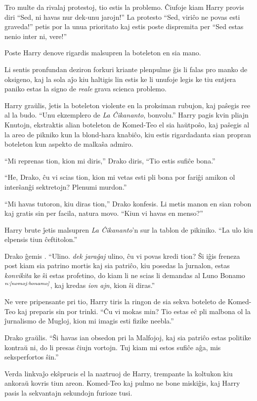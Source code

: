 Tro multe da rivalaj protestoj, tio estis la problemo. Ĉiufoje kiam
Harry provis diri ``Sed, ni havas nur dek-unu jarojn!'' La protesto
``Sed, viriĉo ne povas esti graveda!'' petis por la unua prioritato
kaj estis poste dispremita per ``Sed estas nenio inter ni, vere!''


Poste Harry denove rigardis malsupren la boteleton en sia mano.

Li sentis pronfundan deziron forkuri kriante plenpulme ĝis li falas
pro manko de oksigeno, kaj la sola aĵo kiu haltigis lin estis ke li
unufoje legis ke tiu entjera paniko estas la signo de \emph{reale} grava
scienca problemo.

Harry graŭlis, ĵetis la boteleton violente en la proksiman rubujon, kaj
paŝegis ree al la budo. ``Unu ekzemplero de \emph{La Ĉikananto},
bonvolu.'' Harry pagis kvin pliajn Knutojn, ekstraktis alian boteleton de
Komed-Teo el sia haŭtpoŝo, kaj paŝegis al la areo de pikniko kun
la blond-hara knabiĉo, kiu estis rigardadanta sian propran boteleton kun
aspekto de malkaŝa admiro.

``Mi reprenas tion, kion mi diris,'' Drako diris, ``Tio estis sufiĉe bona.''

``He, Drako, ĉu vi scias tion, kion mi vetas esti pli bona por fariĝi
amikon ol interŝanĝi sektretojn? Plenumi murdon.''

``Mi havas tutoron, kiu diras tion,'' Drako konfesis. Li metis manon
en sian robon kaj gratis sin per facila, natura movo. ``Kiun vi havas
en menso?''

Harry brute ĵetis malsupren \emph{La Ĉikananto}'n sur la tablon de
pikiniko. ``La ulo kiu elpensis tiun ĉeftitolon.''

Drako ĝemis . ``Ulino. \emph{dek jaraĝaj} ulino, ĉu vi povas kredi
tion? Ŝi iĝis freneza post kiam sia patrino mortis kaj sia patriĉo,
kiu posedas la ĵurnalon, estas \emph{konvikita} ke ŝi estas profetino,
do kiam li ne scias li demandas al Luno Bonamo$^{\textit{n:\ref{nomoj:bonamo}}}$,
kaj kredas \emph{ion ajn}, kion ŝi diras.''

Ne vere pripensante pri tio, Harry tiris la ringon de sia sekva
boteleto de Komed-Teo kaj preparis sin por trinki. ``Ĉu vi mokas
min?  Tio estas eĉ pli malbona ol la ĵurnalismo de Mugloj, kion mi
imagis esti fizike neebla.''

Drako graŭlis. ``Ŝi havas ian obsedon pri la Malfojoj, kaj sia patriĉo
estas politike kontraŭ ni, do li presas ĉiujn vortojn. Tuj kiam mi
estos sufiĉe aĝa, mis seksperfortos ŝin.''

Verda linkvaĵo ekŝprucis el la naztruoj de Harry, trempante la
koltukon kiu ankoraŭ kovris tiun areon.  Komed-Teo kaj pulmo ne bone
miskiĝis, kaj Harry pasis la sekvantajn sekundojn furioze tusi.

